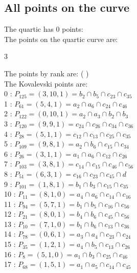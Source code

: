 \documentclass{article}
\begin{document}
{\subsection*{All points on the curve}
The quartic has 0 points:\\
The points on the quartic curve are:\\
\begin{multicols}{3}
\noindent
\end{multicols}
The points by rank are: 
(  )\\
The Kovalevski points are: \\
0 : $P_{125}=( 3, 10, 1 ) = b_{2} \cap b_{5} \cap c_{23} \cap c_{35}$\\
1 : $P_{61}=( 5, 4, 1 ) = a_{2} \cap a_{6} \cap c_{24} \cap c_{46}$\\
2 : $P_{122}=( 0, 10, 1 ) = a_{2} \cap a_{3} \cap b_{2} \cap b_{3}$\\
3 : $P_{120}=( 9, 9, 1 ) = c_{24} \cap c_{26} \cap c_{34} \cap c_{36}$\\
4 : $P_{28}=( 5, 1, 1 ) = c_{12} \cap c_{13} \cap c_{25} \cap c_{35}$\\
5 : $P_{109}=( 9, 8, 1 ) = a_{2} \cap b_{6} \cap c_{15} \cap c_{34}$\\
6 : $P_{26}=( 3, 1, 1 ) = a_{1} \cap a_{6} \cap c_{12} \cap c_{26}$\\
7 : $P_{103}=( 3, 8, 1 ) = c_{14} \cap c_{15} \cap c_{46} \cap c_{56}$\\
8 : $P_{51}=( 6, 3, 1 ) = c_{16} \cap c_{23} \cap c_{45} \cap d$\\
9 : $P_{101}=( 1, 8, 1 ) = b_{1} \cap b_{3} \cap c_{15} \cap c_{35}$\\
10 : $P_{11}=( 8, 1, 0 ) = a_{4} \cap a_{6} \cap c_{14} \cap c_{16}$\\
11 : $P_{94}=( 5, 7, 1 ) = b_{1} \cap b_{5} \cap c_{16} \cap c_{56}$\\
12 : $P_{21}=( 8, 0, 1 ) = b_{4} \cap b_{6} \cap c_{45} \cap c_{56}$\\
13 : $P_{10}=( 7, 1, 0 ) = b_{1} \cap b_{6} \cap c_{13} \cap c_{36}$\\
14 : $P_{78}=( 0, 6, 1 ) = a_{3} \cap a_{4} \cap c_{23} \cap c_{24}$\\
15 : $P_{35}=( 1, 2, 1 ) = a_{4} \cap b_{5} \cap c_{13} \cap c_{26}$\\
16 : $P_{8}=( 5, 1, 0 ) = a_{1} \cap b_{3} \cap c_{25} \cap c_{46}$\\
17 : $P_{68}=( 1, 5, 1 ) = a_{1} \cap a_{5} \cap c_{14} \cap c_{45}$\\
}
\end{document}
